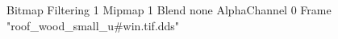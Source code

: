 {Bitmap
	{Filtering 1}
	{Mipmap 1}
	{Blend none}
	{AlphaChannel 0}
	{Frame "roof_wood_small_u#win.tif.dds"}
}
